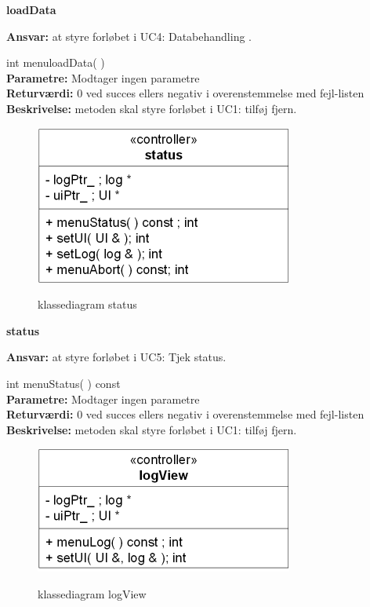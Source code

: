 {\centering
\textbf{loadData}\par
}
\textbf{Ansvar:} at styre forløbet i UC4: Databehandling . \

int menuloadData( ) \\
\textbf{Parametre:} Modtager ingen parametre \\
\textbf{Returværdi:} 0 ved succes ellers negativ i overenstemmelse med fejl-listen \\
\textbf{Beskrivelse:} metoden skal styre forløbet i UC1: tilføj fjern.\\

\begin{figure}[htbp] \centering
{\includegraphics[scale=1.5]{filer/design/Klassediagrammer/sw_status}}
\caption{klassediagram status}
\label{fig:status klassediagram}
\end{figure} 

\newpage

{\centering
\textbf{status}\par
}
\textbf{Ansvar:} at styre forløbet i UC5: Tjek status. \

int menuStatus( ) const \\
\textbf{Parametre:} Modtager ingen parametre \\
\textbf{Returværdi:} 0 ved succes ellers negativ i overenstemmelse med fejl-listen \\
\textbf{Beskrivelse:} metoden skal styre forløbet i UC1: tilføj fjern.\\

\begin{figure}[htbp] \centering
{\includegraphics[scale=1.5]{filer/design/Klassediagrammer/sw_logView}}
\caption{klassediagram logView}
\label{fig:logView klassediagram}
\end{figure}

